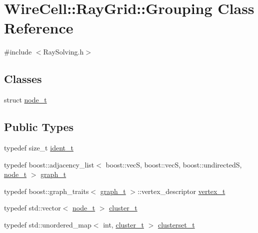 \hypertarget{class_wire_cell_1_1_ray_grid_1_1_grouping}{}\section{Wire\+Cell\+:\+:Ray\+Grid\+:\+:Grouping Class Reference}
\label{class_wire_cell_1_1_ray_grid_1_1_grouping}


{\ttfamily \#include $<$Ray\+Solving.\+h$>$}

\subsection*{Classes}
\begin{DoxyCompactItemize}
\item 
struct \hyperlink{struct_wire_cell_1_1_ray_grid_1_1_grouping_1_1node__t}{node\+\_\+t}
\end{DoxyCompactItemize}
\subsection*{Public Types}
\begin{DoxyCompactItemize}
\item 
typedef size\+\_\+t \hyperlink{class_wire_cell_1_1_ray_grid_1_1_grouping_aa7b318b7f8e9a48aa15d037bd046a09b}{ident\+\_\+t}
\item 
typedef boost\+::adjacency\+\_\+list$<$ boost\+::vecS, boost\+::vecS, boost\+::undirectedS, \hyperlink{struct_wire_cell_1_1_ray_grid_1_1_grouping_1_1node__t}{node\+\_\+t} $>$ \hyperlink{class_wire_cell_1_1_ray_grid_1_1_grouping_a9db75b60d59cf5af39e5957af343b5d7}{graph\+\_\+t}
\item 
typedef boost\+::graph\+\_\+traits$<$ \hyperlink{class_wire_cell_1_1_ray_grid_1_1_grouping_a9db75b60d59cf5af39e5957af343b5d7}{graph\+\_\+t} $>$\+::vertex\+\_\+descriptor \hyperlink{class_wire_cell_1_1_ray_grid_1_1_grouping_a143345784361462296e8357afb885ec0}{vertex\+\_\+t}
\item 
typedef std\+::vector$<$ \hyperlink{struct_wire_cell_1_1_ray_grid_1_1_grouping_1_1node__t}{node\+\_\+t} $>$ \hyperlink{class_wire_cell_1_1_ray_grid_1_1_grouping_a97df53c020a311ad1fccc395195fcd88}{cluster\+\_\+t}
\item 
typedef std\+::unordered\+\_\+map$<$ int, \hyperlink{class_wire_cell_1_1_ray_grid_1_1_grouping_a97df53c020a311ad1fccc395195fcd88}{cluster\+\_\+t} $>$ \hyperlink{class_wire_cell_1_1_ray_grid_1_1_grouping_a0a4ee47c906176803dd7b3e42803d0ed}{clusterset\+\_\+t}
\end{DoxyCompactItemize}
